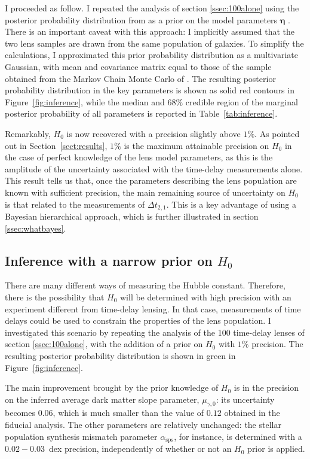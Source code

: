 \documentclass{aa}
\def\asps{\alpha_{\mathrm{sps}}}
\def\hyperpars{\boldsymbol{\eta}}
\def\Sref#1{Section~\ref{#1}\xspace}
\def\Fref#1{Figure~\ref{#1}\xspace}
\def\Tref#1{Table~\ref{#1}\xspace}
\begin{document}
I proceeded as follow. I repeated the analysis of section \ref{ssec:100alone} using the posterior probability distribution from  as a prior on the model parameters $\hyperpars$ .
There is an important caveat with this approach: I implicitly assumed that the two lens samples are drawn from the same population of galaxies.
To simplify the calculations, I approximated this prior probability distribution as a multivariate Gaussian, with mean and covariance matrix equal to those of the sample obtained from the Markov Chain Monte Carlo of . 
The resulting posterior probability distribution in the key parameters is shown as solid red contours in \Fref{fig:inference}, while the median and 68\% credible region of the marginal posterior probability of all parameters is reported in \Tref{tab:inference}.

Remarkably, $H_0$ is now recovered with a precision slightly above $1\%$.
As pointed out in \Sref{sect:results}, $1\%$ is the maximum attainable precision on $H_0$ in the case of perfect knowledge of the lens model parameters, as this is the amplitude of the uncertainty associated with the time-delay measurements alone.
This result tells us that, once the parameters describing the lens population are known with sufficient precision, the main remaining source of uncertainty on $H_0$ is that related to the measurements of $\Delta t_{2,1}$.
This is a key advantage of using a Bayesian hierarchical approach, which is further illustrated in section \ref{ssec:whatbayes}. 


\subsection{Inference with a narrow prior on $H_0$}

There are many different ways of measuring the Hubble constant. Therefore, there is the possibility that $H_0$ will be determined with high precision with an experiment different from time-delay lensing.
In that case, measurements of time delays could be used to constrain the properties of the lens population.
I investigated this scenario by repeating the analysis of the 100 time-delay lenses of section \ref{ssec:100alone}, with the addition of a prior on $H_0$ with $1\%$ precision.
The resulting posterior probability distribution is shown in green in \Fref{fig:inference}.

The main improvement brought by the prior knowledge of $H_0$ is in the precision on the inferred average dark matter slope parameter, $\mu_{\gamma,0}$: its uncertainty becomes $0.06$, which is much smaller than the value of $0.12$ obtained in the fiducial analysis.
The other parameters are relatively unchanged: the stellar population synthesis mismatch parameter $\asps$, for instance, is determined with a $0.02-0.03$~dex precision, independently of whether or not an $H_0$ prior is applied.
\end{document}
